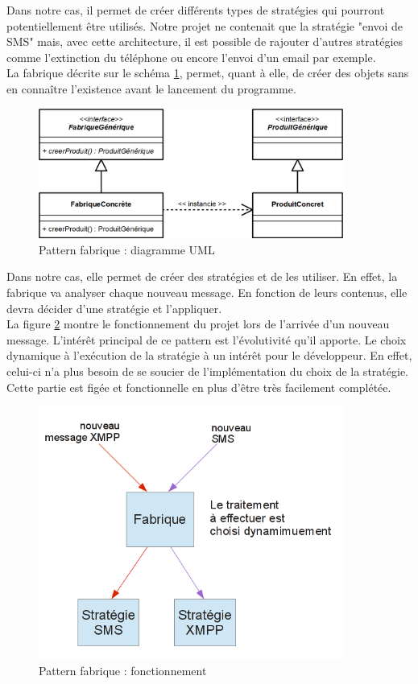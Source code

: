 Dans notre cas, il permet de créer différents types de stratégies qui pourront potentiellement être utilisés. 
Notre projet ne contenait que la stratégie "envoi de SMS" mais, avec cette architecture, il est possible 
de rajouter d'autres stratégies comme l'extinction du téléphone ou encore l'envoi d'un email par exemple.
\\
 
 
La fabrique décrite sur le schéma \ref{pattern_fabrique}, permet, quant à elle, de créer des objets sans en connaître l'existence avant le lancement du programme.
 
\begin{figure}[H]
  \center
  \includegraphics[width=10cm]{img/pattern_fabrique.png}
  \caption{Pattern fabrique : diagramme UML}
  \label{pattern_fabrique}
\end{figure}
 
Dans notre cas, elle permet de créer des stratégies et de les utiliser. En effet, la fabrique 
va analyser chaque nouveau message. En fonction de leurs contenus, elle devra décider d'une stratégie
et l'appliquer.
\\
 
La figure \ref{fonctionnement-strategie-factorie} montre le fonctionnement du projet lors de l'arrivée d'un
nouveau message. L'intérêt principal de ce pattern est l'évolutivité qu'il apporte. Le choix dynamique à
l'exécution de la stratégie à un intérêt pour le développeur. En effet, celui-ci n'a plus besoin de se
soucier de l'implémentation du choix de la stratégie. Cette partie est figée et fonctionnelle en plus d'être très facilement complétée.
 
\begin{figure}[H]
  \center
  \includegraphics[width=10cm]{img/fonctionnement-strategie-factorie.png}
  \caption{Pattern fabrique : fonctionnement}
  \label{fonctionnement-strategie-factorie}
\end{figure}


